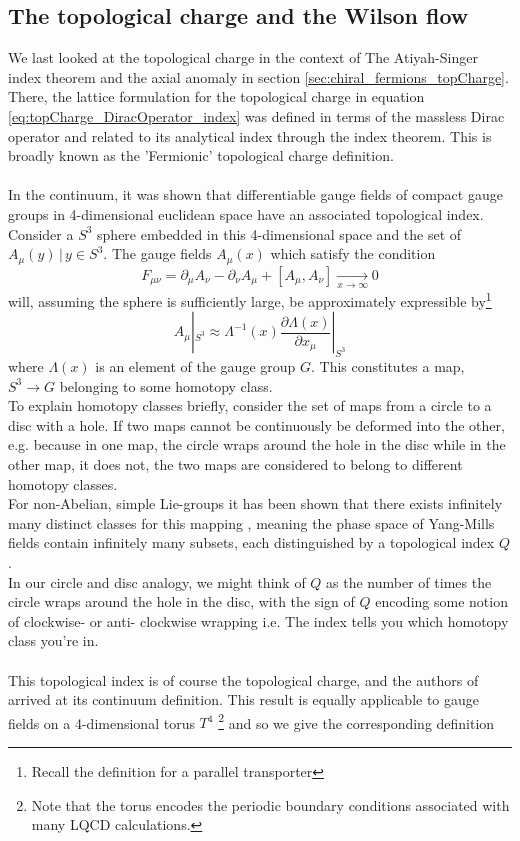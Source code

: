 \documentclass[a4paper,10pt]{article}
\begin{document}
\subsection{The topological charge and the Wilson flow}
We last looked at the topological charge in the context of The Atiyah-Singer index theorem and the axial anomaly in section \ref{sec:chiral_fermions_topCharge}. There, the lattice formulation for the topological charge in equation \eqref{eq:topCharge_DiracOperator_index} was defined in terms of the massless Dirac operator and related to its analytical index through the index theorem. This is broadly known as the 'Fermionic' topological charge definition.\\\\In the continuum, it was shown \cite{BelavinA.A1975Psot} that differentiable gauge fields of compact gauge groups in 4-dimensional euclidean space have an associated topological index. Consider a $S^3$ sphere embedded in this 4-dimensional space and the set of $A_\mu(y)\,|\,y\in S^3$. The gauge fields $A_\mu(x)$ which satisfy the condition 
\begin{equation}
F_{\mu \nu}=\partial_{\mu} A_{\nu}-\partial_{\nu} A_{\mu}+\left[A_{\mu}, A_{\nu}\right] \underset{x \rightarrow \infty}{\rightarrow} 0
\end{equation}
will, assuming the sphere is sufficiently large, be approximately expressible by\footnote{Recall the definition for a parallel transporter}
\begin{equation}
A_{\mu}\left|_{S^{3}} \approx \Lambda^{-1}(x) \frac{\partial \Lambda(x)}{\partial x_{\mu}}\right|_{S^{3}}
\end{equation}
where $\Lambda(x)$ is an element of the gauge group $G$. This constitutes a map, $S^3\rightarrow G$ belonging to some homotopy class.\\ To explain homotopy classes briefly, consider the set of maps from a circle to a disc with a hole. If two maps cannot be continuously be deformed into the other, e.g. because in one map, the circle wraps around the hole in the disc while in the other map, it does not, the two maps are considered to belong to different homotopy classes.\\ For non-Abelian, simple Lie-groups \cite{bredon1993topology} it has been shown that there exists infinitely many distinct classes for this mapping \cite{BelavinA.A1975Psot}, meaning the phase space of Yang-Mills fields contain infinitely many subsets, each distinguished by a topological index $Q$.\\In our circle and disc analogy, we might think of $Q$ as the number of times the circle wraps around the hole in the disc, with the sign of $Q$ encoding some notion of clockwise- or anti- clockwise wrapping i.e. The index tells you which homotopy class you're in.\\\\This topological index is of course the topological charge, and the authors of \cite{BelavinA.A1975Psot} arrived at its continuum definition. This result is equally applicable to gauge fields on a 4-dimensional torus $T^4$ \footnote{Note that the torus encodes the periodic boundary conditions associated with many LQCD calculations.} and so we give the corresponding definition
\end{document}
